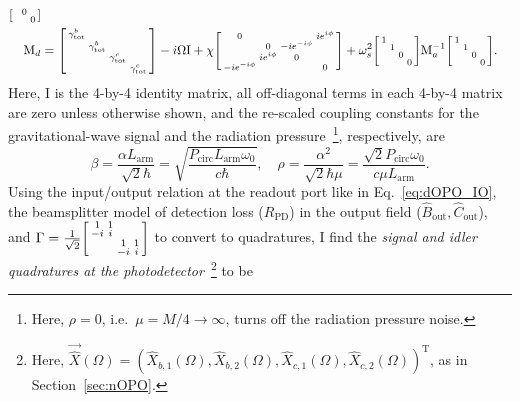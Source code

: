 \begin{align}
\begin{bsmallmatrix}
 &  & 0 &  \\
 &  &  & 0
\end{bsmallmatrix}\\
\text{M}_d&=\begin{bsmallmatrix}
\gamma^b_\mathrm{tot} &  &  &  \\
 & \gamma^b_\mathrm{tot} &  &  \\
 &  & \gamma^c_\mathrm{tot} &  \\
 &  &  & \gamma^c_\mathrm{tot} 
\end{bsmallmatrix}-i\Omega \text{I}+\chi \begin{bsmallmatrix}
0 &  &  & i e^{i\phi} \\
 & 0 & -i e^{-i\phi} &  \\
 & i e^{i\phi} & 0 &  \\
-i e^{-i\phi} &  &  & 0
\end{bsmallmatrix}+\omega_s^2\begin{bsmallmatrix}
1 &  &  &  \\
 & 1 &  &  \\
 &  & 0 &  \\
 &  &  & 0
\end{bsmallmatrix}\text{M}_a^{-1}\begin{bsmallmatrix}
1 &  &  &  \\
 & 1 &  &  \\
 &  & 0 &  \\
 &  &  & 0
\end{bsmallmatrix}.
\end{align}
\endgroup
Here, $\text{I}$ is the 4-by-4 identity matrix, all off-diagonal terms in each 4-by-4 matrix are zero unless otherwise shown, and the re-scaled coupling constants for the gravitational-wave signal and the radiation pressure~\footnote{Here, $\rho=0$, i.e.\ $\mu=M/4\rightarrow\infty$, turns off the radiation pressure noise.}, respectively, are
\begin{equation}\label{eq:beta_and_rho}
\beta = \frac{\alpha L_\mathrm{arm}}{\sqrt{2}\hbar}=\sqrt{\frac{ P_\text{circ}L_\text{arm} \omega_0 }{c  \hbar}},\quad \rho = \frac{\alpha^2}{\sqrt{2}\hbar\mu}=\frac{\sqrt{2} P_\text{circ} \omega_0}{c \mu L_\text{arm}}.
\end{equation}
Using the input/output relation at the readout port like in Eq.~\ref{eq:dOPO_IO}, the beamsplitter model of detection loss ($R_\text{PD}$) in the output field ($\hat{B}_\text{out}, \hat{C}_\text{out}$), and $\Gamma= \frac{1}{\sqrt2}\begin{bsmallmatrix}
1 & 1 &  &  \\
-i & i &  &  \\
 &  & 1 & 1 \\
 &  & -i & i
\end{bsmallmatrix}$ to convert to quadratures, I find the \emph{signal and idler quadratures at the photodetector}~\footnote{Here, $\vec{\hat X}(\Omega)=(\hat X_{b,1}(\Omega),\hat X_{b,2}(\Omega),\hat X_{c,1}(\Omega),\hat X_{c,2}(\Omega))^\text{T}$, as in Section~\ref{sec:nOPO}.} to be
